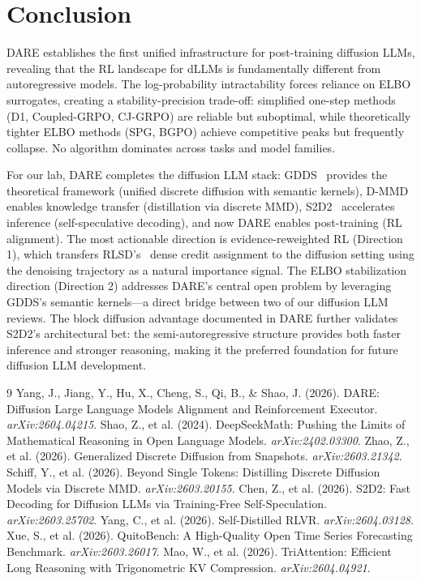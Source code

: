 \documentclass[11pt]{article}
\begin{document}
\section{Conclusion}

DARE establishes the first unified infrastructure for post-training diffusion LLMs, revealing that the RL landscape for dLLMs is fundamentally different from autoregressive models. The log-probability intractability forces reliance on ELBO surrogates, creating a stability-precision trade-off: simplified one-step methods (D1, Coupled-GRPO, CJ-GRPO) are reliable but suboptimal, while theoretically tighter ELBO methods (SPG, BGPO) achieve competitive peaks but frequently collapse. No algorithm dominates across tasks and model families.

For our lab, DARE completes the diffusion LLM stack: GDDS~\cite{gdds} provides the theoretical framework (unified discrete diffusion with semantic kernels), D-MMD~\cite{dmmd} enables knowledge transfer (distillation via discrete MMD), S2D2~\cite{s2d2} accelerates inference (self-speculative decoding), and now DARE enables post-training (RL alignment). The most actionable direction is evidence-reweighted RL (Direction 1), which transfers RLSD's~\cite{rlsd} dense credit assignment to the diffusion setting using the denoising trajectory as a natural importance signal. The ELBO stabilization direction (Direction 2) addresses DARE's central open problem by leveraging GDDS's semantic kernels---a direct bridge between two of our diffusion LLM reviews. The block diffusion advantage documented in DARE further validates S2D2's architectural bet: the semi-autoregressive structure provides both faster inference and stronger reasoning, making it the preferred foundation for future diffusion LLM development.

\begin{thebibliography}{9}
 Yang, J., Jiang, Y., Hu, X., Cheng, S., Qi, B., \& Shao, J. (2026). DARE: Diffusion Large Language Models Alignment and Reinforcement Executor. \textit{arXiv:2604.04215}.
 Shao, Z., et al. (2024). DeepSeekMath: Pushing the Limits of Mathematical Reasoning in Open Language Models. \textit{arXiv:2402.03300}.
 Zhao, Z., et al. (2026). Generalized Discrete Diffusion from Snapshots. \textit{arXiv:2603.21342}.
 Schiff, Y., et al. (2026). Beyond Single Tokens: Distilling Discrete Diffusion Models via Discrete MMD. \textit{arXiv:2603.20155}.
 Chen, Z., et al. (2026). S2D2: Fast Decoding for Diffusion LLMs via Training-Free Self-Speculation. \textit{arXiv:2603.25702}.
 Yang, C., et al. (2026). Self-Distilled RLVR. \textit{arXiv:2604.03128}.
 Xue, S., et al. (2026). QuitoBench: A High-Quality Open Time Series Forecasting Benchmark. \textit{arXiv:2603.26017}.
 Mao, W., et al. (2026). TriAttention: Efficient Long Reasoning with Trigonometric KV Compression. \textit{arXiv:2604.04921}.
\end{thebibliography}
\end{document}
